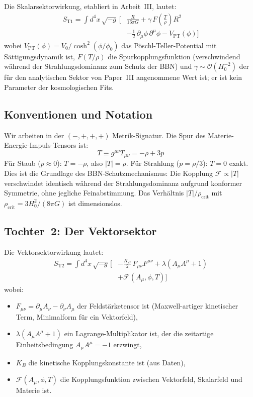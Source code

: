 \documentclass[aps,prd,twocolumn,superscriptaddress,nofootinbib]{revtex4-2}
\begin{document}
Die Skalarsektorwirkung, etabliert in Arbeit~III, lautet:
\begin{align}
S_{\mathrm{T1}} = \int d^4x\,\sqrt{-g}\,\bigg[&
  \frac{R}{16\pi G}
  + \gamma\,F\!\left(\frac{T}{\rho}\right) R^2
\nonumber \\
  &- \frac{1}{2}\,\partial_\mu\phi\,\partial^\mu\phi
  - V_{\mathrm{PT}}(\phi)
\bigg]
\label{eq:S_T1}
\end{align}
wobei $V_{\mathrm{PT}}(\phi) = V_0/\cosh^2(\phi/\phi_0)$ das P\"oschl-Teller-Potential mit S\"attigungsdynamik ist, $F(T/\rho)$ die Spurkopplungsfunktion (verschwindend w\"ahrend der Strahlungsdominanz zum Schutz der BBN) und $\gamma \sim \mathcal{O}(H_0^{-2})$ der f\"ur den analytischen Sektor von Paper~III \cite{Geiger2026c} angenommene Wert ist; er ist kein Parameter der kosmologischen Fits.

\subsection{Konventionen und Notation}
\label{sec:conventions}

Wir arbeiten in der $(-,+,+,+)$ Metrik-Signatur. Die Spur des Materie-Energie-Impuls-Tensors ist:
\begin{equation}
T \equiv g^{\mu\nu}T_{\mu\nu} = -\rho + 3p
\label{eq:trace_def}
\end{equation}
F\"ur Staub ($p \approx 0$): $T = -\rho$, also $|T| = \rho$. F\"ur Strahlung ($p = \rho/3$): $T = 0$ exakt. Dies ist die Grundlage des BBN-Schutzmechanismus: Die Kopplung $\mathcal{F} \propto |T|$ verschwindet identisch w\"ahrend der Strahlungsdominanz aufgrund konformer Symmetrie, ohne jegliche Feinabstimmung. Das Verh\"altnis $|T|/\rho_{\mathrm{crit}}$ mit $\rho_{\mathrm{crit}} = 3H_0^2/(8\pi G)$ ist dimensionslos.

\subsection{Tochter~2: Der Vektorsektor}
\label{sec:vector_action}

Die Vektorsektorwirkung lautet:
\begin{align}
S_{\mathrm{T2}} = \int d^4x\,\sqrt{-g}\,\bigg[&
  -\frac{K_B}{2}\,F_{\mu\nu}F^{\mu\nu}
  + \lambda\!\left(A_\mu A^\mu + 1\right)
\nonumber \\
  &+ \mathcal{F}(A_\mu, \phi, T)
\bigg]
\label{eq:S_T2}
\end{align}
wobei:
\begin{itemize}
\item $F_{\mu\nu} = \partial_\mu A_\nu - \partial_\nu A_\mu$ der Feldst\"arketensor ist (Maxwell-artiger kinetischer Term, Minimalform f\"ur ein Vektorfeld),
\item $\lambda(A_\mu A^\mu + 1)$ ein Lagrange-Multiplikator ist, der die zeitartige Einheitsbedingung $A_\mu A^\mu = -1$ erzwingt,
\item $K_B$ die kinetische Kopplungskonstante ist (aus Daten),
\item $\mathcal{F}(A_\mu, \phi, T)$ die Kopplungsfunktion zwischen Vektorfeld, Skalarfeld und Materie ist.
\end{itemize}
\end{document}
